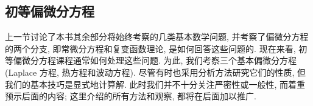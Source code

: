 \subsection{初等偏微分方程}\label{sec:elementary-pdes}

上一节讨论了本书其余部分将始终考察的几类基本数学问题, 并考察了偏微分方程的两个分支, 即常微分方程和复变函数理论, 是如何回答这些问题的. 现在来看, 初等偏微分方程课程通常如何处理这些问题. 为此, 我们考察三个基本偏微分方程 (Laplace 方程, 热方程和波动方程). 尽管有时也采用分析方法研究它们的性质, 但我们的基本技巧是显式地计算解. 此时我们并不十分关注严密性或一般性, 而着重预示后面的内容; 这里介绍的所有方法和观察, 都将在后面加以推广.
